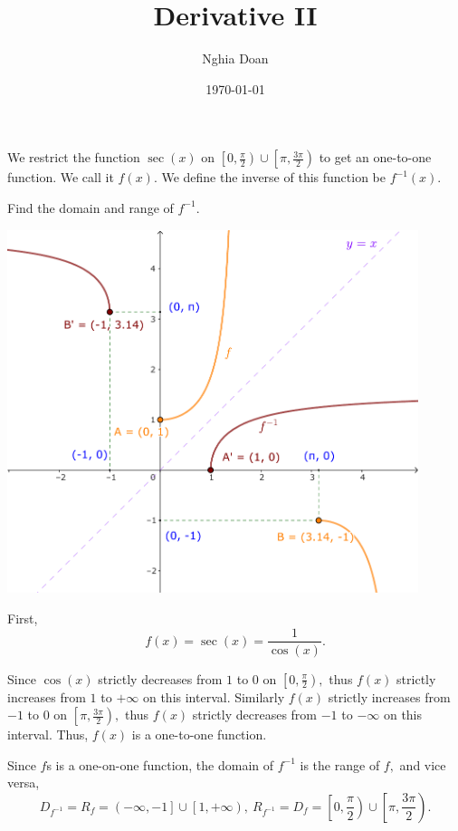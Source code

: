 \documentclass{article}
\title{Derivative II}
\author{Nghia Doan}
\date{\today}
\begin{document}
\maketitle

\begin{problem*}[1a]
    We restrict the function $\sec(x)$ on $\left[ 0, \frac{\pi}{2} \right) \cup \left[ \pi, \frac{3\pi}{2} \right)$ to get an one-to-one function.
    We call it $f(x).$ We define the inverse of this function be $f^{-1}(x).$

    Find the domain and range of $f^{-1}.$
\end{problem*}

\begin{center}
    \includegraphics[width=12cm]{./svg/pdf/derivative-2-1a.pdf}
\end{center}

\begin{soln}
    First,
    \[
        f(x) = \sec(x) = \frac{1}{\cos(x)}.
    \]

    Since $\cos(x)$ strictly decreases from $1$ to $0$ on $\left[ 0, \frac{\pi}{2} \right),$ 
    thus $f(x)$ strictly increases from $1$ to $+\infty$ on this interval.
    Similarly $f(x)$ strictly increases from $-1$ to $0$ on $\left[ \pi, \frac{3\pi}{2} \right),$ 
    thus $f(x)$ strictly decreases from $-1$ to $-\infty$ on this interval.
    Thus, $f(x)$ is a one-to-one function.

    Since $f$s is a one-on-one function, the domain of $f^{-1}$ is the range of $f,$ and vice versa,
    \[
        D_{f^{-1}} = R_f = \left( -\infty, -1 \right] \cup \left[ 1, +\infty \right),\
        R_{f^{-1}} = D_f = \left[ 0, \frac{\pi}{2} \right) \cup \left[ \pi, \frac{3\pi}{2} \right).
    \]
\end{soln}
\end{document}
